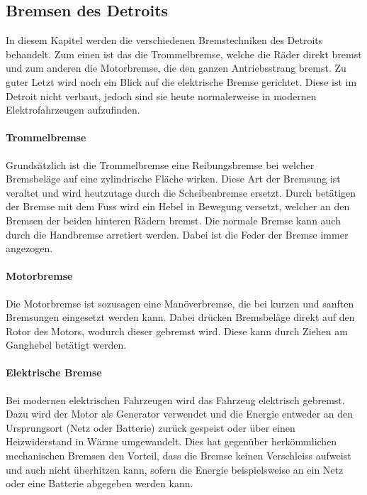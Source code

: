 \subsection{Bremsen des Detroits}\label{bremse}

In diesem Kapitel werden die verschiedenen Bremstechniken des Detroits behandelt. Zum einen ist das die Trommelbremse, welche die Räder direkt bremst und zum anderen die Motorbremse, die den ganzen Antriebsstrang bremst. Zu guter Letzt wird noch ein Blick auf die elektrische Bremse gerichtet. Diese ist im Detroit nicht verbaut, jedoch sind sie heute normalerweise in modernen Elektrofahrzeugen aufzufinden.

\paragraph{Trommelbremse}

Grundsätzlich ist die Trommelbremse eine Reibungsbremse bei welcher Bremsbeläge auf eine zylindrische Fläche wirken. Diese Art der Bremsung ist veraltet und wird heutzutage durch die Scheibenbremse ersetzt. Durch betätigen der Bremse mit dem Fuss wird ein Hebel in Bewegung versetzt, welcher an den Bremsen der beiden hinteren Rädern bremst. Die normale Bremse kann auch durch die Handbremse arretiert werden. Dabei ist die Feder der Bremse immer angezogen.

\paragraph{Motorbremse}

Die Motorbremse ist sozusagen eine Manöverbremse, die bei kurzen und sanften Bremsungen eingesetzt werden kann. Dabei drücken Bremsbeläge direkt auf den Rotor des Motors, wodurch dieser gebremst wird. Diese kann durch Ziehen am Ganghebel betätigt werden.

\paragraph{Elektrische Bremse}
Bei modernen elektrischen Fahrzeugen wird das Fahrzeug elektrisch gebremst. Dazu wird der Motor als Generator verwendet und die Energie entweder an den Ursprungsort (Netz oder Batterie) zurück gespeist oder über einen Heizwiderstand in Wärme umgewandelt. Dies hat gegenüber herkömmlichen mechanischen Bremsen den Vorteil, dass die Bremse keinen Verschleiss aufweist und auch nicht überhitzen kann, sofern die Energie beispielsweise an ein Netz oder eine Batterie abgegeben werden kann.

